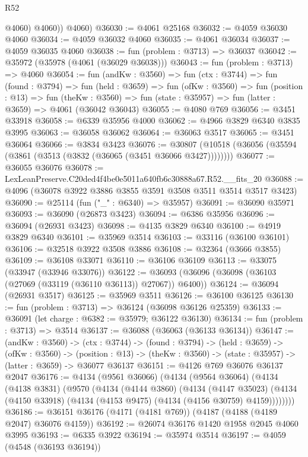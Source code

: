 \begin{lexlean}{R52}
\begin{coremodule}
            @4060)
          @4060))
      @4060)
@36030 := @4061 @25168
@36032 := @4059 @36030 @4060
@36034 := @4059 @36032 @4060
@36035 := @4061 @36034
@36037 := @4059 @36035 @4060
@36038 := fun (problem : @3713) => @36037
@36042 := @35972 (@35978 (@4061 (@36029 @36038)))
@36043 := fun (problem : @3713) => @4060
@36054 := fun (andKw : @3560) =>
  fun (ctx : @3744) =>
  fun (found : @3794) =>
  fun (held : @3659) =>
  fun (ofKw : @3560) =>
  fun (position : @13) =>
  fun (theKw : @3560) => fun (state : @35957) => fun (latter : @3659) => @4061 (@36042 @36043)
@36055 := @4080 @769
@36056 := @3451 @33918
@36058 := @6339 @35956 @4000
@36062 := @4966 @3829 @6340 @3835 @3995
@36063 := @36058 @36062
@36064 := @36063 @3517
@36065 := @3451 @36064
@36066 := @3834 @3423
@36076 := @30807 (@10518 (@36056 (@35594 (@3861 (@3513 (@3832 (@36065 (@3451 @36066 @3427))))))))
@36077 := @36055 @36076
@36078 := LexLeanPreserve.C20ded4f4be0e5011a640fb6c30888a67.R52.__fits_20
@36088 := @4096 (@36078 @3922 @3886 @3855 @3591 @3508 @3511 @3514 @3517 @3423)
@36090 := @25114 (fun ("_" : @6340) => @35957)
@36091 := @36090 @35971
@36093 := @36090 (@26873 @3423)
@36094 := @6386 @35956
@36096 := @36094 (@26931 @3423)
@36098 := @4135 @3829 @6340
@36100 := @4919 @3829 @6340
@36101 := @35969 @3514
@36103 := @33116 (@36100 @36101)
@36106 := @32518 @3922 @3508 @3886
@36108 := @32364 (@3666 @3855)
@36109 := @36108 @33071
@36110 := @36106 @36109
@36113 := @33075 (@33947 (@33946 @33076))
@36122 := @36093 (@36096 (@36098 (@36103 (@27069 (@33119 (@36110 @36113)) @27067)) @6400))
@36124 := @36094 (@26931 @3517)
@36125 := @35969 @3511
@36126 := @36100 @36125
@36130 := fun (problem : @3713) => @36124 (@36098 @36126 @25359)
@36133 := @36091 (let charge : @6382 := @35979; @36122 @36130)
@36134 := fun (problem : @3713) => @3514
@36137 := @36088 (@36063 (@36133 @36134))
@36147 := (andKw : @3560) ->
  (ctx : @3744) ->
  (found : @3794) ->
  (held : @3659) ->
  (ofKw : @3560) ->
  (position : @13) -> (theKw : @3560) -> (state : @35957) -> (latter : @3659) -> @36077 @36137
@36151 := @4126 @769 @36076 @36137 @2047
@36176 := @4134
    (@9561 @36066)
    (@4134
      (@9564 @36064)
      (@4134
        (@4138 @3831)
        (@9570
          (@4134
            (@4144 @3860)
            (@4134
              (@4147 @35023)
              (@4134 (@4150 @33918) (@4134 (@4153 @9475) (@4134 (@4156 @30759) @4159))))))))
@36186 := @36151 @36176 (@4171 (@4181 @769)) (@4187 (@4188 (@4189 @2047) @36076 @4159))
@36192 := @26074 @36176 @1420 @1958 @2045 @4060 @3995
@36193 := @6335 @3922
@36194 := @35974 @3514
@36197 := @4059 (@4548 (@36193 @36194))

\end{coremodule}
\end{lexlean}
